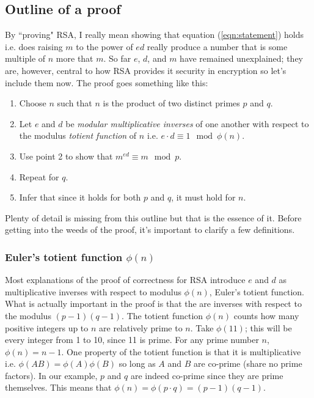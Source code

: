 \documentclass[]{scrartcl}
\theoremstyle{definition}
\let\oldref\ref
\renewcommand{\ref}[1]{(\oldref{#1})}
\begin{document}
\subsection{Outline of a proof}
By ``proving" RSA, I really mean showing that equation \ref{eqn:statement} holds i.e. does raising $m$ to the power of $ed$ really produce a number that is some multiple of $n$ more that $m$. So far $e$, $d$, and $m$ have remained unexplained; they are, however, central to how RSA provides it security in encryption so let's include them now. The proof goes something like this:
\begin{enumerate}
    \item Choose $n$ such that $n$ is the product of two distinct primes $p$ and $q$.
    \item Let $e$ and $d$ be \textit{modular multiplicative inverses} of one another with respect to the modulus \textit{totient function} of $n$ i.e. $e\cdot d \equiv 1 \mod \phi(n)$.
    \item Use point 2 to show that $m^{ed} \equiv m \mod p$.
    \item Repeat for $q$.
    \item Infer that since it holds for both $p$ and $q$, it must hold for $n$.
\end{enumerate}
Plenty of detail is missing from this outline but that is the essence of it. Before getting into the weeds of the proof, it's important to clarify a few definitions.
\subsubsection{Euler's totient function $\phi(n)$}
Most explanations of the proof of correctness for RSA introduce $e$ and $d$ as multiplicative inverses with respect to modulus $\phi(n)$, Euler's totient function. What is actually important in the proof is that the are inverses with respect to the modulus $(p-1)(q-1)$. The totient function $\phi(n)$ counts how many positive integers up to $n$ are relatively prime to $n$. Take $\phi(11)$; this will be every integer from 1 to 10, since 11 is prime. For any prime number $n$, $\phi(n) = n-1$. One property of the totient function is that it is multiplicative i.e. $\phi(AB) = \phi(A)\phi(B)$ so long as $A$ and $B$ are co-prime (share no prime factors). In our example, $p$ and $q$ are indeed co-prime since they are prime themselves. This means that $\phi(n)=\phi(p\cdot q)=(p-1)(q-1)$.
\end{document}
